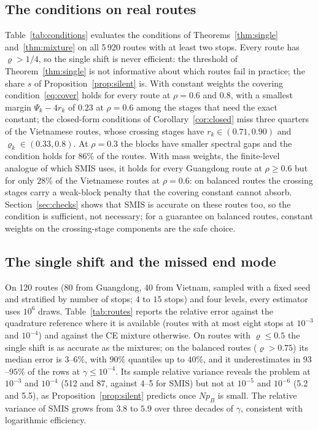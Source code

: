 \documentclass[11pt]{article}
\theoremstyle{definition}
\theoremstyle{remark}
\begin{document}
\subsection{The conditions on real routes}
Table~\ref{tab:conditions} evaluates the conditions of Theorems~\ref{thm:single}
and~\ref{thm:mixture} on all 5\,920 routes with at least two stops. Every route has
$\varrho>1/4$, so the single shift is never efficient: the threshold of
Theorem~\ref{thm:single} is not informative about which routes fail in practice; the
share $s$ of Proposition~\ref{prop:silent} is. With constant weights the covering condition~\eqref{eq:cover}
holds for every route at $\rho=0.6$ and $0.8$, with a smallest margin $\Psi_k-4r_k$ of
$0.23$ at $\rho=0.6$ among the stages that need the exact constant; the closed-form
conditions of Corollary~\ref{cor:closed} miss three quarters of the Vietnamese routes,
whose crossing stages have $r_k\in(0.71,0.90)$ and $\varrho_k\in(0.33,0.8)$. At $\rho=0.3$
the blocks have smaller spectral gaps and the condition holds for $86\%$ of the routes.
With mass weights, the finite-level analogue of which SMIS uses, it holds for every
Guangdong route at $\rho\ge0.6$ but for only $28\%$ of the Vietnamese routes at
$\rho=0.6$: on balanced routes the crossing stages carry a weak-block penalty that the
covering constant cannot absorb. Section~\ref{sec:checks} shows that SMIS is accurate
on these routes too, so the condition is sufficient, not necessary; for a guarantee on
balanced routes, constant weights on the crossing-stage components are the safe
choice.



\subsection{The single shift and the missed end mode}
On 120 routes (80 from Guangdong, 40 from Vietnam, sampled with a fixed seed and
stratified by number of stops; $4$ to $15$ stops) and four levels, every estimator uses
$10^6$ draws. Table~\ref{tab:routes} reports the relative error against the quadrature
reference where it is available (routes with at most eight stops at $10^{-3}$ and
$10^{-4}$) and against the CE mixture otherwise. On routes with $\varrho\le0.5$ the single
shift is as accurate as the mixtures; on the balanced routes ($\varrho>0.75$) its median
error is $3$--$6\%$, with $90\%$ quantiles up to $40\%$, and it underestimates in
$93$--$95\%$ of the rows at $\gamma\le10^{-4}$. Its sample relative variance reveals the
problem at $10^{-3}$ and $10^{-4}$ (512 and 87, against 4--5 for SMIS) but not at
$10^{-5}$ and $10^{-6}$ (5.2 and 5.5), as Proposition~\ref{prop:silent} predicts once
$Np_B$ is small. The relative variance of SMIS grows from $3.8$ to $5.9$ over three
decades of $\gamma$, consistent with logarithmic efficiency.
\end{document}
